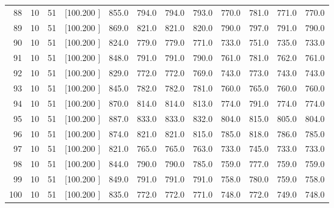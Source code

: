\documentclass[12pt,a4paper]{article}
\begin{document}
\begin{center}
{\begin{tabular}{r r r r r r r r r r r r}
  88& 10& 51&[100.200   ]&   855.0&   794.0&   794.0&   793.0&   770.0&   781.0&   771.0&   770.0\\[-0.02in]
  89& 10& 51&[100.200   ]&   869.0&   821.0&   821.0&   820.0&   790.0&   797.0&   791.0&   790.0\\[-0.02in]
  90& 10& 51&[100.200   ]&   824.0&   779.0&   779.0&   771.0&   733.0&   751.0&   735.0&   733.0\\[-0.02in]
  91& 10& 51&[100.200   ]&   848.0&   791.0&   791.0&   790.0&   761.0&   781.0&   762.0&   761.0\\[-0.02in]
  92& 10& 51&[100.200   ]&   829.0&   772.0&   772.0&   769.0&   743.0&   773.0&   743.0&   743.0\\[-0.02in]
  93& 10& 51&[100.200   ]&   845.0&   782.0&   782.0&   781.0&   760.0&   765.0&   760.0&   760.0\\[-0.02in]
  94& 10& 51&[100.200   ]&   870.0&   814.0&   814.0&   813.0&   774.0&   791.0&   774.0&   774.0\\[-0.02in]
  95& 10& 51&[100.200   ]&   887.0&   833.0&   833.0&   832.0&   804.0&   815.0&   805.0&   804.0\\[-0.02in]
  96& 10& 51&[100.200   ]&   874.0&   821.0&   821.0&   815.0&   785.0&   818.0&   786.0&   785.0\\[-0.02in]
  97& 10& 51&[100.200   ]&   821.0&   765.0&   765.0&   763.0&   733.0&   745.0&   733.0&   733.0\\[-0.02in]
  98& 10& 51&[100.200   ]&   844.0&   790.0&   790.0&   785.0&   759.0&   777.0&   759.0&   759.0\\[-0.02in]
  99& 10& 51&[100.200   ]&   849.0&   791.0&   791.0&   791.0&   758.0&   780.0&   759.0&   758.0\\[-0.02in]
 100& 10& 51&[100.200   ]&   835.0&   772.0&   772.0&   771.0&   748.0&   772.0&   749.0&   748.0\\[-0.02in]

\hline
\end{tabular}}
\end{center}
\end{document}
